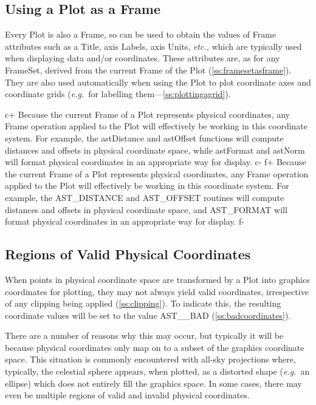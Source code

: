 \documentclass[twoside,11pt]{article}
\newcommand{\secref}[1]{\S\ref{#1}}
\renewcommand{\secref}[1]{\ref{#1}}
\begin{document}
\subsection{Using a Plot as a Frame}

Every Plot is also a Frame, so can be used to obtain the values of
Frame attributes such as a Title, axis Labels, axis Units,
{\em{etc.,}} which are typically used when displaying data and/or
coordinates. These attributes are, as for any FrameSet, derived from
the current Frame of the Plot (\secref{ss:framesetasframe}). They are
also used automatically when using the Plot to plot coordinate axes
and coordinate grids ({\em{e.g.}}\ for labelling
them---\secref{ss:plottingagrid}).

c+
Because the current Frame of a Plot represents physical coordinates,
any Frame operation applied to the Plot will effectively be working in
this coordinate system. For example, the astDistance and astOffset
functions will compute distances and offsets in physical coordinate
space, while astFormat and astNorm will format physical coordinates in
an appropriate way for display.
c-
f+
Because the current Frame of a Plot represents physical coordinates,
any Frame operation applied to the Plot will effectively be working in
this coordinate system. For example, the AST\_DISTANCE and AST\_OFFSET
routines will compute distances and offsets in physical coordinate
space, and AST\_FORMAT will format physical coordinates in an
appropriate way for display.
f-

\subsection{\label{ss:validphysicalcoordinates}Regions of Valid Physical Coordinates}

When points in physical coordinate space are transformed by a Plot
into graphics coordinates for plotting, they may not always yield
valid coordinates, irrespective of any clipping being applied
(\secref{ss:clipping}). To indicate this, the resulting coordinate
values will be set to the value AST\_\_BAD
(\secref{ss:badcoordinates}).

There are a number of reasons why this may occur, but typically it
will be because physical coordinates only map on to a subset of the
graphics coordinate space. This situation is commonly encountered with
all-sky projections where, typically, the celestial sphere appears,
when plotted, as a distorted shape ({\em{e.g.}}\ an ellipse) which
does not entirely fill the graphics space. In some cases, there may
even be multiple regions of valid and invalid physical coordinates.
\end{document}
